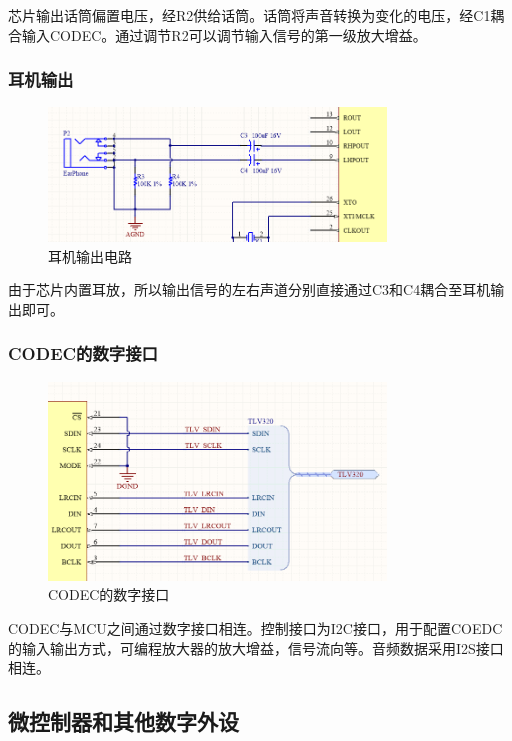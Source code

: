 \documentclass[16pt,a4paper]{article}
\begin{document}
芯片输出话筒偏置电压，经R2供给话筒。话筒将声音转换为变化的电压，经C1耦合输入CODEC。通过调节R2可以调节输入信号的第一级放大增益。

\subsubsection{耳机输出}
\begin{figure}[H]
\centering
\includegraphics[width=0.8\textwidth]{EarPhone.png}
\caption{耳机输出电路} 
\end{figure}
由于芯片内置耳放，所以输出信号的左右声道分别直接通过C3和C4耦合至耳机输出即可。

\subsubsection{CODEC的数字接口}
\begin{figure}[H]
\centering
\includegraphics[width=0.8\textwidth]{DI.png}
\caption{CODEC的数字接口} 
\end{figure}
CODEC与MCU之间通过数字接口相连。控制接口为I2C接口，用于配置COEDC的输入输出方式，可编程放大器的放大增益，信号流向等。音频数据采用I2S接口相连。

\subsection{微控制器和其他数字外设}
\end{document}
